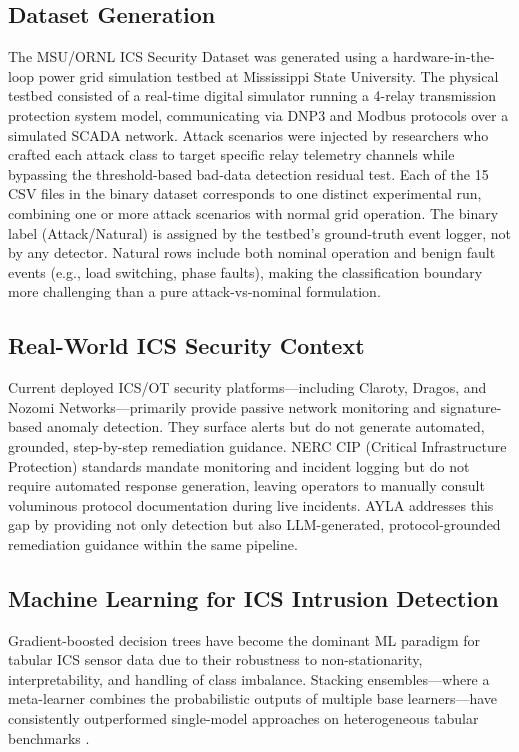 \documentclass[twocolumn, 10pt, letterpaper]{article}
\begin{document}
\subsection{Dataset Generation}

The MSU/ORNL ICS Security Dataset \cite{morris2014ics} was generated using a
hardware-in-the-loop power grid simulation testbed at Mississippi State University.
The physical testbed consisted of a real-time digital simulator running a
4-relay transmission protection system model, communicating via DNP3 and Modbus
protocols over a simulated SCADA network.
Attack scenarios were injected by researchers who crafted each attack class to target
specific relay telemetry channels while bypassing the threshold-based bad-data
detection residual test.
Each of the 15 CSV files in the binary dataset corresponds to one distinct
experimental run, combining one or more attack scenarios with normal grid operation.
The binary label (Attack/Natural) is assigned by the testbed's ground-truth event
logger, not by any detector.
Natural rows include both nominal operation and benign fault events (e.g., load
switching, phase faults), making the classification boundary more challenging than
a pure attack-vs-nominal formulation.

\subsection{Real-World ICS Security Context}

Current deployed ICS/OT security platforms---including Claroty, Dragos, and
Nozomi Networks---primarily provide passive network monitoring and signature-based
anomaly detection.
They surface alerts but do not generate automated, grounded, step-by-step
remediation guidance.
NERC CIP (Critical Infrastructure Protection) standards mandate monitoring and
incident logging but do not require automated response generation, leaving operators
to manually consult voluminous protocol documentation during live incidents.
AYLA addresses this gap by providing not only detection but also LLM-generated,
protocol-grounded remediation guidance within the same pipeline.

\subsection{Machine Learning for ICS Intrusion Detection}

Gradient-boosted decision trees have become the dominant ML paradigm for
tabular ICS sensor data due to their robustness to non-stationarity, interpretability,
and handling of class imbalance.
Stacking ensembles---where a meta-learner combines the probabilistic outputs of
multiple base learners---have consistently outperformed single-model approaches
on heterogeneous tabular benchmarks \cite{panthi2022ensemble}.
\end{document}

